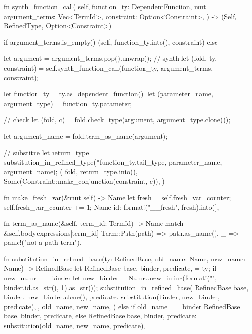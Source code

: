 \documentclass[
  oneside,
  english,
  coorientadorbanca,
  noabntexcite
]{ufsc-thesis-rn46-2019}
\begin{document}
\begin{rustcode}
{    fn synth_function_call(
        self,
        function_ty: DependentFunction,
        mut argument_terms: Vec<TermId>,
        constraint: Option<Constraint>,
    ) -> (Self, RefinedType, Option<Constraint>) {
        if argument_terms.is_empty() {
            (self, function_ty.into(), constraint)
        } else {
            let argument = argument_terms.pop().unwrap();
            // synth
            let (fold, ty, constraint) =
                self.synth_function_call(function_ty, argument_terms, constraint);

            let function_ty = ty.as_dependent_function();
            let (parameter_name, argument_type) = function_ty.parameter;

            // check
            let (fold, c) = fold.check_type(argument, argument_type.clone());

            let argument_name = fold.term_as_name(argument);

            // substitue
            let return_type =
                substitution_in_refined_type(*function_ty.tail_type, parameter_name, argument_name);
            (
                fold,
                return_type.into(),
                Some(Constraint::make_conjunction(constraint, c)),
            )
        }
    }

    fn make_fresh_var(&mut self) -> Name {
        let fresh = self.fresh_var_counter;
        self.fresh_var_counter += 1;
        Name {
            id: format!("__fresh{}", fresh).into(),
        }
    }

    fn term_as_name(&self, term_id: TermId) -> Name {
        match &self.body.expressions[term_id] {
            Term::Path(path) => path.as_name(),
            _ => panic!("not a path term"),
        }
    }
}

fn substitution_in_refined_base(ty: RefinedBase, old_name: Name, new_name: Name) -> RefinedBase {
    let RefinedBase {
        base,
        binder,
        predicate,
    } = ty;
    if new_name == binder {
        let new_binder = Name::new_inline(format!("{}{}", binder.id.as_str(), 1).as_str());
        substitution_in_refined_base(
            RefinedBase {
                base,
                binder: new_binder.clone(),
                predicate: substitution(binder, new_binder, predicate),
            },
            old_name,
            new_name,
        )
    } else if old_name == binder {
        RefinedBase {
            base,
            binder,
            predicate,
        }
    } else {
        RefinedBase {
            base,
            binder,
            predicate: substitution(old_name, new_name, predicate),
        }
    }
}


\end{rustcode}
\end{document}
